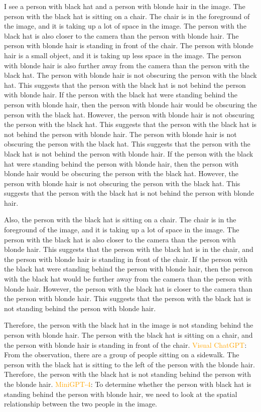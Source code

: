 \begin{enumerate}
    I see a person with black hat and a person with blonde hair in the image.
    The person with the black hat is sitting on a chair. The chair is in the foreground of the image, and it is taking up a lot of space in the image. The person with the black hat is also closer to the camera than the person with blonde hair.
    The person with blonde hair is standing in front of the chair. The person with blonde hair is a small object, and it is taking up less space in the image. The person with blonde hair is also further away from the camera than the person with the black hat.
    The person with blonde hair is not obscuring the person with the black hat. This suggests that the person with the black hat is not behind the person with blonde hair.
    If the person with the black hat were standing behind the person with blonde hair, then the person with blonde hair would be obscuring the person with the black hat. However, the person with blonde hair is not obscuring the person with the black hat. This suggests that the person with the black hat is not behind the person with blonde hair.
    The person with blonde hair is not obscuring the person with the black hat. This suggests that the person with the black hat is not behind the person with blonde hair. If the person with the black hat were standing behind the person with blonde hair, then the person with blonde hair would be obscuring the person with the black hat. However, the person with blonde hair is not obscuring the person with the black hat. This suggests that the person with the black hat is not behind the person with blonde hair.
    
    Also, the person with the black hat is sitting on a chair. The chair is in the foreground of the image, and it is taking up a lot of space in the image. The person with the black hat is also closer to the camera than the person with blonde hair. This suggests that the person with the black hat is in the chair, and the person with blonde hair is standing in front of the chair. If the person with the black hat were standing behind the person with blonde hair, then the person with the black hat would be further away from the camera than the person with blonde hair. However, the person with the black hat is closer to the camera than the person with blonde hair. This suggests that the person with the black hat is not standing behind the person with blonde hair.
    
    Therefore, the person with the black hat in the image is not standing behind the person with blonde hair. The person with the black hat is sitting on a chair, and the person with blonde hair is standing in front of the chair.
    \subitem \textcolor{orange}{Visual ChatGPT}: From the observation, there are a group of people sitting on a sidewalk. The person with the black hat is sitting to the left of the person with the blonde hair. Therefore, the person with the black hat is not standing behind the person with the blonde hair.
    \subitem \textcolor{orange}{MiniGPT-4}: To determine whether the person with black hat is standing behind the person with blonde hair, we need to look at the spatial relationship between the two people in the image.


\end{enumerate}
